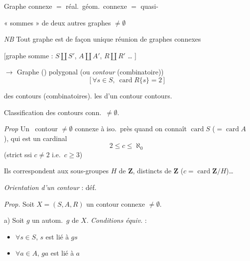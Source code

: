 \documentclass[11pt,a4paper]{article}
\begin{document}
Graphe connexe $=$ réal.\ géom.\ connexe $=$ quasi-

\struck{\ill{}} « sommes » de deux autres graphes $\neq \emptyset$

\emph{NB} Tout graphe est de façon unique réunion de graphes connexes

[graphe somme : $S \amalg S'$, $A \amalg A'$, $R \amalg R'$ … ]

$\to$ Graphe () polygonal (ou \emph{contour}
(combinatoire))
\[
  \bigl[\, \forall s \in S, \ \operatorname{card} R\{s\} = 2 \,\bigr]
\]

 des  
contours (combinatoires).
\struck{\ill{}} les  d'un 
contour   contours.

Classification des  contours conn.\ $\neq \emptyset$.

\emph{Prop} Un \ contour $\neq \emptyset$ connexe
 à iso.\ près quand on connaît $\operatorname{card} S$
($= \operatorname{card} A$), qui est un cardinal 
\[
  2 \leq c \leq \aleph_0
\]
(strict ssi $c \neq 2$ i.e.\ $c \geq 3$)

Ils correspondent aux sous-groupes $H$ de $\mathbf{Z}$, distincts de
$\mathbf{Z}$ ($c = \operatorname{card} \mathbf{Z}/H$)…


\emph{Orientation d'un contour} : déf.

\emph{Prop.} Soit $X = (S, A, R)$ un contour \struck{\ill{}} connexe
$\neq \emptyset$.

a) Soit  $g$ un autom.\ $g$ de $X$. \emph{Conditions équiv.}
\struck{\ill{}} :
\begin{itemize}
  \item[1°)] \struck{\ill{}} $\forall s \in S$, $s$ est lié à $gs$
  \item[2°)] $\forall a \in A$, $ga$ est lié à $a$
\end{itemize}
\end{document}
